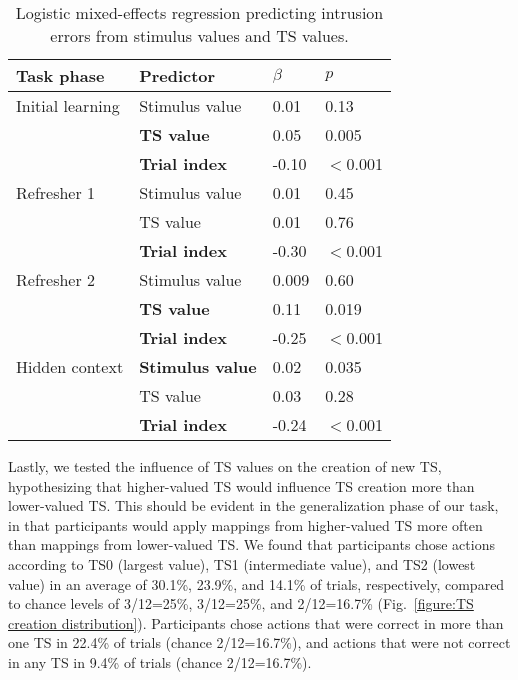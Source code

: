 \documentclass[10pt, letterpaper]{article}
\begin{document}
\begin{table}[!ht]
\begin{center} 
\caption{Logistic mixed-effects regression predicting intrusion errors from stimulus values and TS values.} 
\label{table:intrusions} 
\vskip 0.1in
\small{
\begin{tabular}{llll} 
\hline
Task phase          &   Predictor               &   $\beta$ &   $p$ \\
\hline
Initial learning    &   Stimulus value          &   0.01    &   0.13 \\
                    &   {\bf TS value}          &   0.05    &   0.005 \\
                    &   {\bf Trial index}       &   -0.10   &   $<$0.001 \\
Refresher 1         &   Stimulus value          &   0.01    &   0.45 \\
                    &   TS value                &   0.01    &   0.76 \\
                    &   {\bf Trial index}       &   -0.30   &   $<$0.001 \\
Refresher 2         &   Stimulus value          &   0.009   &   0.60 \\
                    &   {\bf TS value}          &   0.11    &   0.019 \\
                    &   {\bf Trial index}       &   -0.25   &   $<$0.001 \\
Hidden context      &   {\bf Stimulus value}    &   0.02    &   0.035 \\
                    &   TS value                &   0.03    &   0.28 \\
                    &   {\bf Trial index}       &   -0.24   &   $<$0.001 \\
\hline
\end{tabular}
}
\end{center} 
\end{table}

Lastly, we tested the influence of TS values on the creation of new TS, hypothesizing that higher-valued TS would influence TS creation more than lower-valued TS. This should be evident in the generalization phase of our task, in that participants would apply mappings from higher-valued TS more often than mappings from lower-valued TS. We found that participants chose actions according to TS0 (largest value), TS1 (intermediate value), and TS2 (lowest value) in an average of 30.1\%, 23.9\%, and 14.1\% of trials, respectively, compared to chance levels of 3/12=25\%, 3/12=25\%, and 2/12=16.7\% (Fig.~\ref{figure:TS creation distribution}). Participants chose actions that were correct in more than one TS in 22.4\% of trials (chance 2/12=16.7\%), and actions that were not correct in any TS in 9.4\% of trials (chance 2/12=16.7\%).
\end{document}
